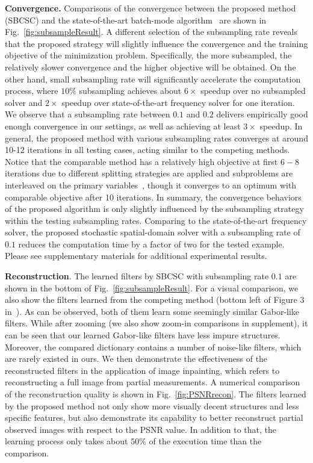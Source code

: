 {\bfseries Convergence.} Comparisons of the convergence between the proposed method (SBCSC) and the state-of-the-art batch-mode algorithm~\cite{heide2015fast} are shown in Fig.\ \ref{fig:subsampleResult}. A different selection of the subsampling rate reveals that the proposed strategy will slightly influence the convergence and the training objective of the minimization problem. Specifically, the more subsampled, the relatively slower convergence and the higher objective will be obtained. On the other hand, small subsampling rate will significantly accelerate the computation process, where $10\%$ subsampling achieves about $6 \times$ speedup over no subsampled solver and $2 \times$ speedup over state-of-the-art frequency solver for one iteration. We observe that a subsampling rate between $0.1$ and $0.2$ delivers empirically good enough convergence in our settings, as well as achieving at least $3 \times$ speedup. In general, the proposed method with various subsampling rates converges at around 10-12 iterations in all testing cases, acting similar to the competing methods. Notice that the comparable method has a relatively high objective at first $6-8$ iterations due to different splitting strategies are applied and subproblems are interleaved on the primary variables~\cite{wohlberg2016efficient}, though it converges to an optimum with comparable objective after 10 iterations. In summary, the convergence behaviors of the proposed algorithm is only slightly influenced by the subsampling strategy within the testing subsampling rates. Comparing to the state-of-the-art frequency solver, the proposed stochastic spatial-domain solver with a subsampling rate of $0.1$ reduces the computation time by a factor of two for the tested example. Please see supplementary materials for additional experimental results.

{\bfseries Reconstruction}. The learned filters by SBCSC with subsampling rate $0.1$ are shown in the bottom of Fig.\ \ref{fig:subsampleResult}. For a visual comparison, we also show the filters learned from the competing method (bottom left of Figure 3 in~\cite{heide2015fast}). As can be observed, both of them learn some seemingly similar Gabor-like filters. While after zooming (we also show zoom-in comparisons in supplement), it can be seen that our learned Gabor-like filters have less impure structures. Moreover, the compared dictionary contains a number of noise-like filters, which are rarely existed in ours. We then demonstrate the effectiveness of the reconstructed filters in the application of image inpainting, which refers to reconstructing a full image from partial measurements. A numerical comparison of the reconstruction quality is shown in Fig.\ \ref{fig:PSNRrecon}. The filters learned by the proposed method not only show more visually decent structures and less specific features, but also demonstrate its capability to better reconstruct partial observed images with respect to the PSNR value. In addition to that, the learning process only takes about $50\%$ of the execution time than the comparison.

